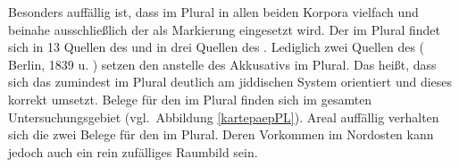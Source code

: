 	 \begin{table}


		 \caption{Verstöße gegen das schriftdeutsche Kasussystem im  bei Präpositionalphrasen}
		 \label{tblpräpkasusjüdliji}
		 \end{table}

Besonders auffällig ist, dass im Plural in allen beiden Korpora vielfach und beinahe ausschließlich der  als Markierung eingesetzt wird. Der  im Plural findet sich in 13 Quellen des  und in drei Quellen des .  
Lediglich zwei Quellen des  (\hai{{\PP}} Berlin, 1839 u. ) setzen den  anstelle des Akkusativs im Plural. Das heißt, dass sich das \hai{{\LiJi}} zumindest im Plural deutlich am jiddischen System orientiert und dieses korrekt umsetzt. Belege für den  im Plural finden sich im gesamten Untersuchungsgebiet (vgl.\, Abbildung \ref{kartepaepPL}). Areal auffällig verhalten sich die zwei Belege für den  im Plural. Deren Vorkommen im Nordosten kann jedoch auch ein rein zufälliges Raumbild sein.

